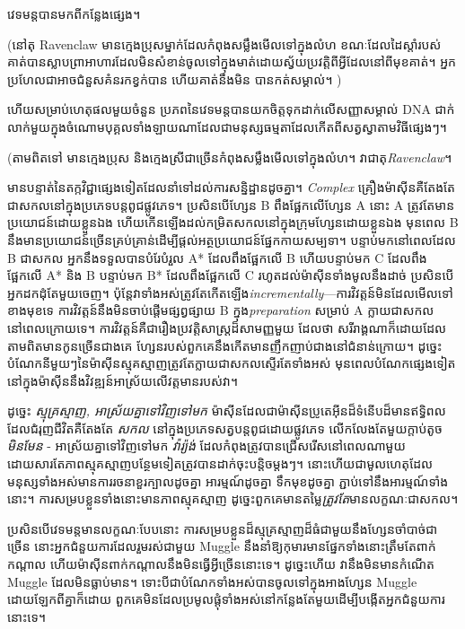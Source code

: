 វេទមន្តបានមកពីកន្លែងផ្សេង។

(នៅតុ Ravenclaw មានក្មេងប្រុសម្នាក់ដែលកំពុងសម្លឹងមើលទៅក្នុងលំហ ខណៈដែលដៃស្តាំរបស់គាត់បានស្លាបព្រាអាហារដែលមិនសំខាន់ចូលទៅក្នុងមាត់ដោយស្វ័យប្រវត្តិពីអ្វីដែលនៅពីមុខគាត់។ អ្នកប្រហែលជាអាចជំនួសគំនរកខ្វក់បាន ហើយគាត់នឹងមិន បានកត់សម្គាល់។ )

ហើយសម្រាប់ហេតុផលមួយចំនួន ប្រភពនៃវេទមន្តបានយកចិត្តទុកដាក់លើសញ្ញាសម្គាល់ DNA ជាក់លាក់មួយក្នុងចំណោមបុគ្គលទាំងឡាយណាដែលជាមនុស្សធម្មតាដែលកើតពីសត្វស្វាតាមវិធីផ្សេងៗ។

(តាមពិតទៅ មានក្មេងប្រុស និងក្មេងស្រីជាច្រើនកំពុងសម្លឹងមើលទៅក្នុងលំហ។ វាជាតុ\emph{Ravenclaw}។

មានបន្ទាត់នៃតក្កវិជ្ជាផ្សេងទៀតដែលនាំទៅដល់ការសន្និដ្ឋានដូចគ្នា។ \emph{Complex} គ្រឿងម៉ាស៊ីនគឺតែងតែជាសកលនៅក្នុងប្រភេទបន្តពូជផ្លូវភេទ។ ប្រសិនបើហ្សែន B ពឹងផ្អែកលើហ្សែន A នោះ A ត្រូវតែមានប្រយោជន៍ដោយខ្លួនឯង ហើយកើនឡើងដល់កម្រិតសកលនៅក្នុងក្រុមហ្សែនដោយខ្លួនឯង មុនពេល B នឹងមានប្រយោជន៍ច្រើនគ្រប់គ្រាន់ដើម្បីផ្តល់អត្ថប្រយោជន៍ផ្នែកកាយសម្បទា។ បន្ទាប់មកនៅពេលដែល B ជាសកល អ្នកនឹងទទួលបានបំរែបំរួល A* ដែលពឹងផ្អែកលើ B ហើយបន្ទាប់មក C ដែលពឹងផ្អែកលើ A* និង B បន្ទាប់មក B* ដែលពឹងផ្អែកលើ C រហូតដល់ម៉ាស៊ីនទាំងមូលនឹងដាច់ ប្រសិនបើអ្នកដកដុំតែមួយចេញ។ ប៉ុន្តែវាទាំងអស់ត្រូវតែកើតឡើង\emph{incrementally}—ការវិវត្តន៍មិនដែលមើលទៅខាងមុខទេ ការវិវត្តន៍នឹងមិនចាប់ផ្តើមផ្សព្វផ្សាយ B ក្នុង\emph{preparation} សម្រាប់ A ក្លាយជាសកលនៅពេលក្រោយទេ។ ការវិវត្តន៍គឺជារឿងប្រវត្តិសាស្ត្រដ៏សាមញ្ញមួយ ដែលថា សរីរាង្គណាក៏ដោយដែលតាមពិតមានកូនច្រើនជាងគេ ហ្សែនរបស់ពួកគេនឹងកើតមានញឹកញាប់ជាងនៅជំនាន់ក្រោយ។ ដូច្នេះបំណែកនីមួយៗនៃម៉ាស៊ីនស្មុគស្មាញត្រូវតែក្លាយជាសកលស្ទើរតែទាំងអស់ មុនពេលបំណែកផ្សេងទៀតនៅក្នុងម៉ាស៊ីននឹងវិវឌ្ឍន៍អាស្រ័យលើវត្តមានរបស់វា។

ដូច្នេះ \emph{ស្មុគ្រស្មាញ, អាស្រ័យគ្នាទៅវិញទៅមក} ម៉ាស៊ីនដែលជាម៉ាស៊ីនប្រូតេអ៊ីនដ៏ទំនើបដ៏មានឥទ្ធិពលដែលជំរុញជីវិតគឺតែងតែ \emph{សកល} នៅក្នុងប្រភេទសត្វបន្តពូជដោយផ្លូវភេទ លើកលែងតែមួយក្តាប់តូច \emph{មិនមែន} - អាស្រ័យគ្នាទៅវិញទៅមក \emph{វ៉ារ្យ៉ង់} ដែលកំពុងត្រូវបានជ្រើសរើសនៅពេលណាមួយ ដោយសារតែភាពស្មុគស្មាញបន្ថែមទៀតត្រូវបានដាក់ចុះបន្តិចម្តងៗ។ នោះហើយជាមូលហេតុដែលមនុស្សទាំងអស់មានការរចនាខួរក្បាលដូចគ្នា អារម្មណ៍ដូចគ្នា ទឹកមុខដូចគ្នា ភ្ជាប់ទៅនឹងអារម្មណ៍ទាំងនោះ។ ការសម្របខ្លួនទាំងនោះមានភាពស្មុគស្មាញ ដូច្នេះពួកគេមានតម្លៃ\emph{ត្រូវតែ}មានលក្ខណៈជាសកល។

ប្រសិនបើវេទមន្តមានលក្ខណៈបែបនោះ ការសម្របខ្លួនដ៏ស្មុគ្រស្មាញដ៏ធំជាមួយនឹងហ្សែនចាំបាច់ជាច្រើន នោះអ្នកជំនួយការដែលរួមរស់ជាមួយ Muggle នឹងនាំឱ្យកុមារមានផ្នែកទាំងនោះត្រឹមតែពាក់កណ្តាល ហើយម៉ាស៊ីនពាក់កណ្តាលនឹងមិនធ្វើអ្វីច្រើននោះទេ។ ដូច្នេះហើយ វានឹងមិនមានកំណើត Muggle ដែលមិនធ្លាប់មាន។ ទោះបីជាបំណែកទាំងអស់បានចូលទៅក្នុងអាងហ្សែន Muggle ដោយឡែកពីគ្នាក៏ដោយ ពួកគេមិនដែលប្រមូលផ្តុំទាំងអស់នៅកន្លែងតែមួយដើម្បីបង្កើតអ្នកជំនួយការនោះទេ។

